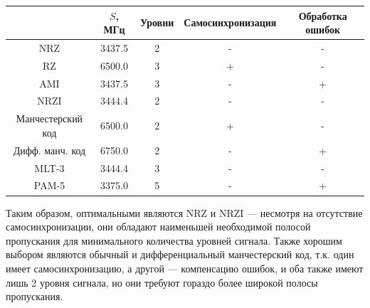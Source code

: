 \begin{center}
    \begin{tabular}{c|cccc}
        & $S$, МГц
        & Уровни
        & Самосинхронизация
        & Обработка ошибок \\ \hline
        NRZ               & 3437.5 & 2 & - & - \\
        RZ                & 6500.0 & 3 & + & - \\
        AMI               & 3437.5 & 3 & - & + \\
        NRZI              & 3444.4 & 2 & - & - \\
        Манчестерский код & 6500.0 & 2 & + & - \\
        Дифф. манч. код   & 6750.0 & 2 & - & + \\
        MLT-3             & 3444.4 & 3 & - & - \\
        PAM-5             & 3375.0 & 5 & - & + \\
    \end{tabular}
\end{center}

Таким образом, оптимальными являются NRZ и NRZI --- несмотря на отсутствие самосинхронизации,
они обладают наименьшей необходимой полосой пропускания для минимального количества уровней сигнала.
Также хорошим выбором являются обычный и дифференциальный манчестерский код, т.к.
один имеет самосинхронизацию, а другой --- компенсацию ошибок, и оба также имеют лишь 2 уровня сигнала,
но они требуют гораздо более широкой полосы пропускания.

